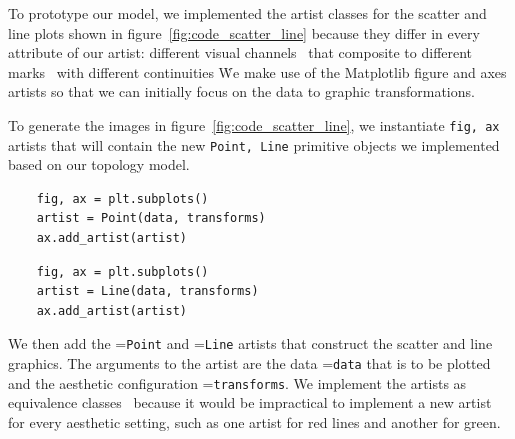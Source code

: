 \documentclass[../main.tex]{subfiles}
\begin{document}
To prototype our model, we implemented the artist classes for the scatter and line plots shown in figure~\ref{fig:code_scatter_line} because they differ in every attribute of our artist: different visual channels \vchannel\ that composite to different marks \vmark\ with different continuities \vindex\.  We make use of the Matplotlib figure and axes artists \cite{hunterArchitectureOpenSource,hunterMatplotlib2DGraphics2007} so that we can initially focus on the data to graphic transformations. 

To generate the images in figure~\ref{fig:code_scatter_line}, we instantiate \texttt{fig, ax} artists that will contain the new \texttt{Point, Line} primitive objects we implemented based on our topology model. 

\begin{multicols*}{2}
\begin{verbatim}
    fig, ax = plt.subplots()
    artist = Point(data, transforms)
    ax.add_artist(artist)
\end{verbatim}
\columnbreak
\begin{verbatim}
    fig, ax = plt.subplots()
    artist = Line(data, transforms)
    ax.add_artist(artist)
\end{verbatim}
\end{multicols*}

We then add the \vartisteq=\texttt{Point} and  \vartisteq=\texttt{Line} artists that construct the scatter and line graphics. The arguments to the artist are the data \dtotal=\texttt{data} that is to be plotted and the aesthetic configuration \vchannel=\texttt{transforms}. We implement the artists as equivalence classes \vartisteq\ because it would be impractical to implement a new artist for every aesthetic setting, such as one artist for red lines and another for green.


 
\end{document}

